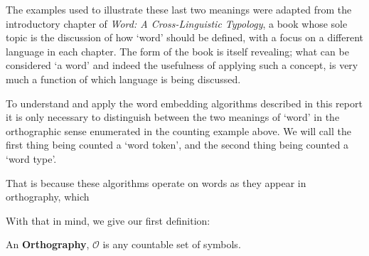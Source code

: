 The examples used to illustrate these last two meanings were adapted from the introductory chapter of \textit{Word: A Cross-Linguistic Typology}, a book whose sole topic is the discussion of how `word' should be defined, with a focus on a different language in each chapter. The form of the book is itself revealing; what can be considered `a word' and indeed the usefulness of applying such a concept, is very much a function of which language is being discussed.

To understand and apply the word embedding algorithms described in this report it is only necessary to distinguish between the two meanings of `word' in the orthographic sense enumerated in the counting example above. We will call the first thing being counted a `word token', and the second thing being counted a `word type'.

That is because these algorithms operate on words as they appear in orthography, which 


With that in mind, we give our first definition:

\begin{definition}
  An \textbf{Orthography}, \(\mathscr{O}\) is any countable set of symbols.
\end{definition}



